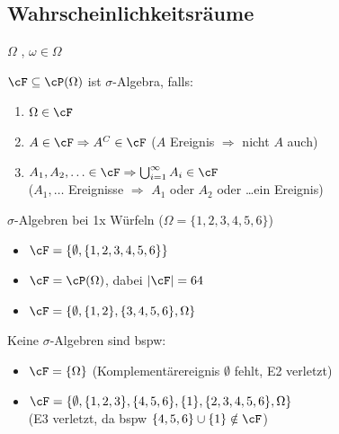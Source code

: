 \subsection{Wahrscheinlichkeitsräume}
\shortterm $\Omega$ , $\omega \in \Omega$ 

 $\cF \subseteq \cP(\Omega)$ ist $\sigma$-Algebra, falls:
\begin{enumerate}[label=\textbf{E\arabic*.}]
    \item $\Omega \in \cF$
    \item $A \in \cF \Rightarrow A^C \in \cF$ ($A$ Ereignis $\Rightarrow$ nicht $A$ auch)
    \item $A_1, A_2, \ldots \in \cF \Rightarrow \bigcup_{i = 1}^\infty A_i \in \cF$\\
        ($A_1, \ldots$ Ereignisse $\Rightarrow$ $A_1$ oder $A_2$ oder \dots ein Ereignis)
\end{enumerate}

\shortexample $\sigma$-Algebren bei 1x Würfeln ($\Omega = \{ 1, 2, 3, 4, 5, 6 \}$)
\begin{itemize}
    \item $\cF = \{ \emptyset, \{ 1, 2, 3, 4, 5, 6 \} \}$
    \item $\cF = \cP(\Omega)$, dabei $|\cF| = 64$
    \item $\cF = \{ \emptyset, \{ 1, 2 \}, \{ 3, 4, 5, 6 \}, \Omega \}$
\end{itemize}

Keine $\sigma$-Algebren sind bspw:
\begin{itemize}
    \item $\cF = \{ \Omega \}$ (Komplementärereignis $\emptyset$ fehlt, E2 verletzt)
    \item $\cF = \{ \emptyset, \{ 1, 2, 3 \}, \{ 4, 5, 6 \}, \{ 1 \}, \{ 2, 3, 4, 5, 6 \}, \Omega \}$\\
        (E3 verletzt, da bspw $\{ 4, 5, 6 \} \cup \{ 1 \} \notin \cF$)
\end{itemize}


